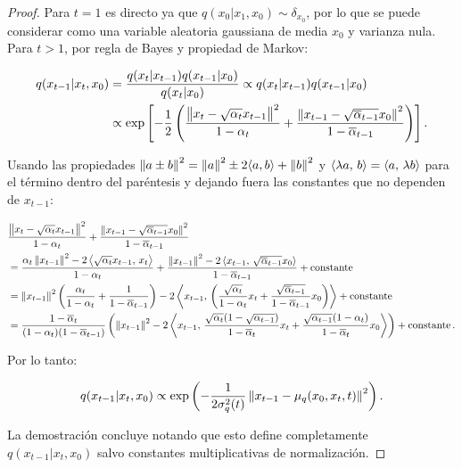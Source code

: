 \begin{proof}

    Para $t=1$ es directo ya que $q(x_0|x_1,x_0)\sim\delta_{x_0}$, por lo que se puede considerar como una variable aleatoria gaussiana de media $x_0$ y varianza nula. Para $t>1$, por regla de Bayes y propiedad de Markov:

    \begin{align*}
        q(x_{t-1}|x_t,x_0) & = \frac{q(x_t|x_{t-1})q(x_{t-1}|x_0)}{q(x_t|x_0)}\propto q(x_t|x_{t-1})q(x_{t-1}|x_0)\\
                           & \propto \exp\left[-\frac{1}{2}\left(\frac{\left\lVert x_t-\sqrt{\alpha_t}x_{t-1} \right\rVert^2}{1-\alpha_t} + \frac{\left\lVert x_{t-1}-\sqrt{\overline{\alpha}_{t-1}}x_0 \right\rVert^2}{1-\overline{\alpha}_{t-1}}\right)\right].
    \end{align*}

    Usando las propiedades $\left\lVert a\pm b \right\rVert^2=\left\lVert a \right\rVert^2\pm 2\langle a,b\rangle + \left\lVert b \right\rVert^2$ y $\left\langle \lambda a,\,b\right\rangle = \left\langle a,\,\lambda b\right\rangle$ para el término dentro del paréntesis y dejando fuera las constantes que no dependen de $x_{t-1}$:

    \begin{align*}
         & \frac{\left\lVert x_t-\sqrt{\alpha_t}x_{t-1} \right\rVert^2}{1-\alpha_t} + \frac{\left\lVert x_{t-1}-\sqrt{\overline{\alpha}_{t-1}}x_0 \right\rVert^2}{1-\overline{\alpha}_{t-1}}\\
         & = \frac{\alpha_t\left\lVert x_{t-1} \right\rVert^2-2\left\langle \sqrt{\alpha_t}x_{t-1},\,x_t\right\rangle}{1-\alpha_t} + \frac{\left\lVert x_{t-1} \right\rVert^2-2\left\langle x_{t-1},\,\sqrt{\overline{\alpha}_{t-1}} x_0\right\rangle}{1-\overline{\alpha}_{t-1}}+\operatorname{constante}\\
         & =\left\lVert x_{t-1} \right\rVert^2\left(\frac{\alpha_t}{1-\alpha_t}+\frac{1}{1-\overline{\alpha}_{t-1}}\right)-2\left\langle x_{t-1},\,\left(\frac{\sqrt{\alpha_t}}{1-\alpha_t}x_t + \frac{\sqrt{\overline{\alpha}_{t-1}}}{1-\overline{\alpha}_{t-1}}x_0\right)\right\rangle + \operatorname{constante}\\
         & =\frac{1-\overline{\alpha}_{t}}{(1-\alpha_t)(1-\overline{\alpha}_{t-1})}\left(\left\lVert x_{t-1} \right\rVert^2-2\left\langle x_{t-1},\,\frac{\sqrt{\alpha_t}(1-\sqrt{\alpha_{t-1}})}{1-\overline{\alpha}_t}x_t+\frac{\sqrt{\alpha_{t-1}}(1-\alpha_t)}{1-\overline{\alpha}_t}x_0\right\rangle\right) + \operatorname{constante} .\\
    \end{align*}

    Por lo tanto:

    \begin{equation*}
        q(x_{t-1}|x_t,x_0) \propto \exp\left(-\frac{1}{2\sigma_q^2(t)}\left\lVert x_{t-1}-\mu_q(x_0,x_t,t) \right\rVert^2\right).
    \end{equation*}

    La demostración concluye notando que esto define completamente $q(x_{t-1}|x_t,x_0)$ salvo constantes multiplicativas de normalización.
\end{proof}

